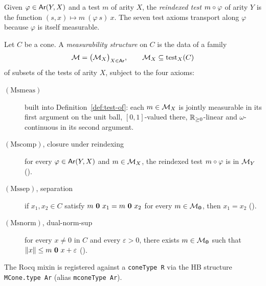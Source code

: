 
\begin{definition}
  \label{def:test-reindex}
  \rocqok
  Given $\varphi \in \mathsf{Ar}(Y, X)$ and a test $m$ of arity $X$, the
  \emph{reindexed test} $m \circ \varphi$ of arity $Y$ is the
  function $(s, x) \mapsto m\ (\varphi\ s)\ x$. The seven
  test axioms transport along $\varphi$ because $\varphi$ is itself
  measurable.
\end{definition}


\begin{definition}%
  \label{def:isMCone}
  \rocqok
  Let $C$ be a cone. A \emph{measurability structure} on $C$ is the
  data of a family
  \[
    \mathcal{M} = \bigl(\mathcal{M}_X\bigr)_{X \in \mathsf{Ar}},
    \qquad
    \mathcal{M}_X \subseteq \mathrm{test}_{X}(C)
  \]
  of subsets of the tests of arity $X$, subject to the four axioms:
  \begin{description}
    \item[$(\mathrm{Msmeas})$] built into Definition~\ref{def:test-of}:
      each $m \in \mathcal{M}_X$ is jointly measurable in its first
      argument on the unit ball, $[0,1]$-valued there, $\mathbb{R}_{\geq 0}$-linear
      and $\omega$-continuous in its second argument.
    \item[$(\mathrm{Mscomp})$, closure under reindexing] for every
      $\varphi \in \mathsf{Ar}(Y, X)$ and $m \in \mathcal{M}_X$, the reindexed test
      $m \circ \varphi$ is in $\mathcal{M}_Y$
      ().
    \item[$(\mathrm{Mssep})$, separation] if $x_1, x_2 \in C$ satisfy
      $m\ \arzero\ x_1 = m\ \arzero\ x_2$ for every
      $m \in \mathcal{M}_{\mathbf{0}}$, then $x_1 = x_2$
      ().
    \item[$(\mathrm{Msnorm})$, dual-norm-sup] for every $x \ne 0$ in
      $C$ and every $\varepsilon > 0$, there exists
      $m \in \mathcal{M}_{\mathbf{0}}$ such that
      $\lVert x \rVert \le m\ \mathbf{0}\ x + \varepsilon$
      ().
  \end{description}
  The Rocq mixin is registered against a \texttt{coneType\ R} via
  the HB structure \texttt{MCone.type\ Ar} (alias
  \texttt{mconeType\ Ar}).
\end{definition}

